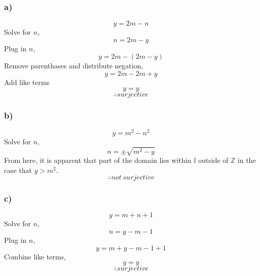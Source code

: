 \documentclass[journal]{IEEEtran}
\begin{document}
    \subsubsection*{a)}
        \begin{equation}
            y = 2m - n
        \end{equation}
        Solve for $n$,
        \begin{equation}
            n = 2m - y
        \end{equation}
        Plug in $n$,
        \begin{equation}
            y = 2m - (2m - y)
        \end{equation}
        Remove parenthases and distribute negation,
        \begin{equation}
            y = 2m - 2m + y
        \end{equation}
        Add like terms
        \begin{equation}
            y = y
        \end{equation}
        \begin{equation}
            \boxed{\therefore surjective}
        \end{equation}

    \subsubsection*{b)}
        \begin{equation}
            y = m^2 - n^2
        \end{equation}
        Solve for $n$,
        \begin{equation}
            n = \pm \sqrt{m^2 - y}
        \end{equation}
        From here, it is apparent that part of the domain lies within  $\mathbb{I}$ outside of $\mathbb{Z}$ in 
        the case that $y > m^2$.
        \begin{equation}
            \boxed{\therefore not~surjective}
        \end{equation}

    \subsubsection*{c)}
        \begin{equation}
            y = m + n + 1
        \end{equation}
        Solve for $n$,
        \begin{equation}
            n = y - m - 1
        \end{equation}
        Plug in $n$,
        \begin{equation}
            y = m + y - m - 1 + 1
        \end{equation}
        Combine like terms,
        \begin{equation}
            y = y
        \end{equation}
        \begin{equation}
            \boxed{\therefore surjective}
        \end{equation}
\end{document}
